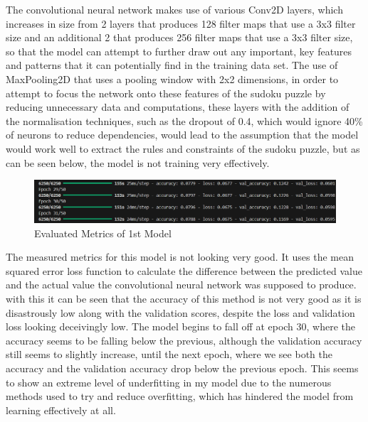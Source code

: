 \documentclass[]{final_report}
\begin{document}
The convolutional neural network makes use of various Conv2D layers, which increases in size from 2 layers that produces 128 filter maps that use a 3x3 filter size and an additional 2 that produces 256 filter maps that use a 3x3 filter size, so that the model can attempt to further draw out any important, key features and patterns that it can potentially find in the training data set. The use of MaxPooling2D that uses a pooling window with 2x2 dimensions, in order to attempt to focus the network onto these features of the sudoku puzzle by reducing unnecessary data and computations, these layers with the addition of the normalisation techniques, such as the dropout of 0.4, which would ignore 40\% of neurons to reduce dependencies, would lead to the assumption that the model would work well to extract the rules and constraints of the sudoku puzzle, but as can be seen below, the model is not training very effectively. 

\clearpage
\begin{figure}[ht]
    \centering 
    \begin{minipage}{1.1\textwidth} 
        \includegraphics[width=\textwidth]{images/first model metrics.png} 
        \caption{Evaluated Metrics of 1st Model} 
        \label{fig: Evaluated Metrics of 1st Model} 
    \end{minipage} 
    \hfill 
\end{figure}

The measured metrics for this model is not looking very good. It uses the mean squared error loss function to calculate the difference between the predicted value and the actual value the convolutional neural network was supposed to produce. with this it can be seen that the accuracy of this method is not very good as it is disastrously low along with the validation scores, despite the loss and validation loss looking deceivingly low. The model begins to fall off at epoch 30, where the accuracy seems to be falling below the previous, although the validation accuracy still seems to slightly increase, until the next epoch, where we see both the accuracy and the validation accuracy drop below the previous epoch. This seems to show an extreme level of underfitting in my model due to the numerous methods used to try and reduce overfitting, which has hindered the model from learning effectively at all. 
\end{document}
